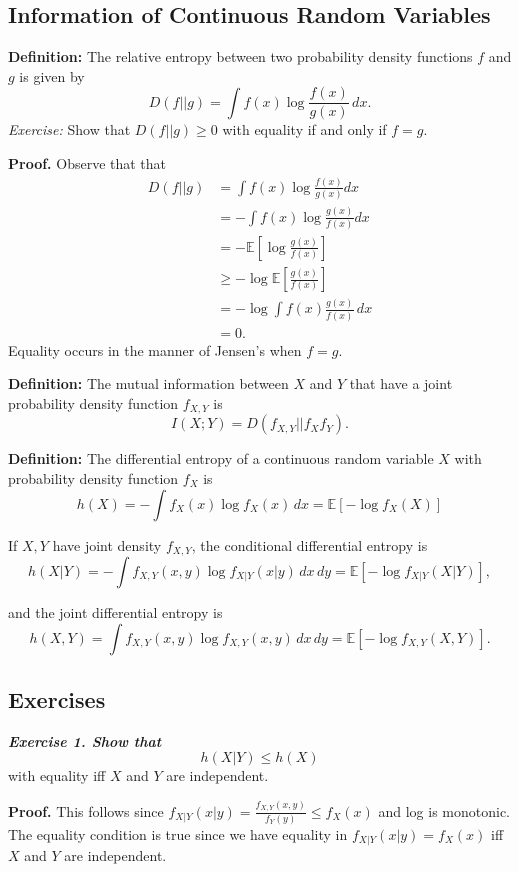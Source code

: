 \subsection{Information of Continuous Random Variables}
\textbf{Definition:} The relative entropy between two probability density functions $f$ and $g$ is given by
\[
D(f||g) = \int f(x) \log \frac{f(x)}{g(x)} \, dx.
\]
{\it Exercise:} Show that $D(f||g) \geq 0$ with equality if and only if $f = g$.

\textbf{Proof.} Observe that that
\begin{align*}
D(f||g)&=\int f(x)\log\frac{f(x)}{g(x)}dx\\
&=-\int f(x)\log\frac{g(x)}{f(x)}dx\\
&=-\mathbb{E}\left [\log\frac{g(x)}{f(x)} \right]\\
&\geq-\log\mathbb{E}\left [\frac{g(x)}{f(x)} \right ]\\
&=-\log\int f(x)\frac{g(x)}{f(x)} \, dx \\
&=0.
\end{align*}
Equality occurs in the manner of Jensen's when $f=g.$

\textbf{Definition:} The mutual information between $X$ and $Y$ that have a joint probability density function $f_{X, Y}$ is
\[
I(X; Y) = D(f_{X, Y} || f_X f_Y).
\]

\textbf{Definition:} The differential entropy of a continuous random variable $X$ with probability density function $f_X$ is
\[
h(X) = - \int f_X(x) \log f_X(x) \, dx = \mathbb{E} \left [ - \log f_X(X) \right ]
\]

If $X, Y$ have joint density $f_{X, Y}$, the conditional differential entropy is
\[
h(X|Y) = - \int f_{X, Y} (x, y) \log f_{X|Y} (x|y) \, dx \, dy = \mathbb{E} [ - \log f_{X|Y} (X|Y)],
\]

and the joint differential entropy is
\[
h(X, Y) = \int f_{X, Y} (x, y) \log f_{X, Y} (x, y) \, dx \, dy = \mathbb{E} [- \log f_{X, Y} (X, Y)].
\]

\subsection{Exercises}
\textbf{\textit{Exercise 1.  Show that}}
\[
h(X | Y ) \leq h(X)
\]
with equality iff $X$ and $Y$ are independent.

\textbf{Proof.} This follows since $f_{X|Y}(x|y)=\frac{f_{X,Y}(x,y)}{f_{Y}(y)}\leq f_X(x)$ and log is monotonic. The equality condition is true since we have equality in $f_{X|Y}(x|y)=f_X(x)$ iff $X$ and $Y$ are independent.


